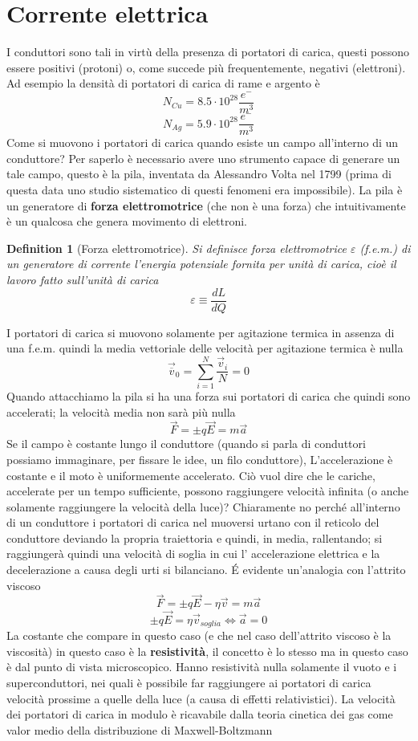 \documentclass[10pt,a4paper]{article}
\newtheorem{definition}{Definition}
\begin{document}
\section{Corrente elettrica}
I conduttori sono tali in virtù della presenza di portatori di carica, questi possono essere positivi (protoni) o, come succede più frequentemente, negativi (elettroni). Ad esempio la densità di portatori di carica di rame e argento è
\[N_{Cu} = 8.5 \cdot 10^{28}\frac{e^-}{m^3}\]
\[N_{Ag} = 5.9\cdot 10^{28}\frac{e^-}{m^3}\]
Come si muovono i portatori di carica quando esiste un campo all'interno di un conduttore? Per saperlo è necessario avere uno strumento capace di generare un tale campo, questo è la pila, inventata da Alessandro Volta nel 1799 (prima di questa data uno studio sistematico di questi fenomeni era impossibile). La pila è un generatore di \textbf{forza elettromotrice} (che non è una forza) che intuitivamente è un qualcosa che genera movimento di elettroni.
\begin{definition}[Forza elettromotrice]
	Si definisce forza elettromotrice \(\varepsilon\) (f.e.m.) di un generatore di corrente l'energia potenziale fornita per unità di carica, cioè il lavoro fatto sull'unità di carica
	\[\varepsilon \equiv \frac{dL}{dQ}\]
\end{definition}
I portatori di carica si muovono solamente per agitazione termica in assenza di una f.e.m. quindi la media vettoriale delle velocità per agitazione termica è nulla
\[\vec{\overline{v}}_0= \sum_{i = 1}^{N}\frac{\vec{v}_i}{N}=0\]
Quando attacchiamo la pila si ha una forza sui portatori di carica che quindi sono accelerati; la velocità media non sarà più nulla
\[\vec{F}= \pm q\vec{E}= m \vec{a}\]
Se il campo è costante lungo il conduttore (quando si parla di conduttori possiamo immaginare, per fissare le idee, un filo conduttore), L'accelerazione è costante e il moto è uniformemente accelerato. Ciò vuol dire che le cariche, accelerate per un tempo sufficiente, possono raggiungere velocità infinita (o anche solamente raggiungere la velocità della luce)? Chiaramente no perché all'interno di un conduttore i portatori di carica nel muoversi urtano con il reticolo del conduttore deviando la propria traiettoria e quindi, in media, rallentando; si raggiungerà quindi una velocità di soglia in cui l' accelerazione elettrica e la decelerazione a causa degli urti si bilanciano. \'E evidente un'analogia con l'attrito viscoso
\[\vec{F} = \pm q\vec{E}-\eta\vec{v}=m\vec{a}\]
\[\pm q\vec{E}=\eta\vec{v}_{soglia} \Leftrightarrow \vec{a}= 0\]
La costante che compare in questo caso (e che nel caso dell'attrito viscoso è la viscosità) in questo caso è la \textbf{resistività}, il concetto è lo stesso ma in questo caso è dal punto di vista microscopico. Hanno resistività nulla solamente il vuoto e i superconduttori, nei quali è possibile far raggiungere ai portatori di carica velocità prossime a quelle della luce (a causa di effetti relativistici). La velocità dei portatori di carica in modulo è ricavabile dalla teoria cinetica dei gas come valor medio della distribuzione di Maxwell-Boltzmann
\end{document}
